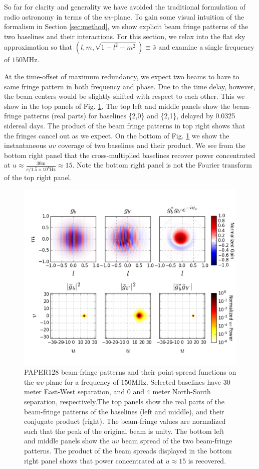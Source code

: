 \documentclass[twocolumn,apj,numberedappendix]{emulateapj}
\renewcommand\[{\begin{equation}}
\renewcommand\]{\end{equation}}
\begin{document}
So far for clarity and generality we have avoided the traditional formulation of radio astronomy in terms of the $uv$-plane. To gain some visual intuition of the formalism in Section \ref{sec:method}, we show explicit beam fringe patterns of the two baselines and their interactions. For this section, we relax into the flat sky approximation so that $(l,m,\sqrt{1-l^2-m^2})\equiv\hat{s}$ and examine a single frequency of $150$MHz. 

At the time-offset of maximum redundancy, we expect two beams to have to same fringe pattern in both frequency and phase. Due to the time delay, however, the beam centers would be slightly shifted with respect to each other. This we show in the top panels of Fig. \ref{fig:beamfringe}. The top left and middle panels show the beam-fringe
patterns (real parts) for baselines \{2,0\} and \{2,1\}, delayed by 0.0325 sidereal days.
The product of the beam fringe patterns in top right shows that the fringes
 cancel out as we expect. On the bottom of Fig. \ref{fig:beamfringe} we show the instantaneous $uv$ coverage of two baselines and their product. We see from the bottom right panel that the cross-multiplied baselines recover  power concentrated at $u\approx\frac{30\text{m}}{c/1.5\times10^8\text{Hz}}\approx15$. Note the bottom right panel is not the Fourier transform of the top right panel. 

\begin{figure}[h!]
\includegraphics[width=\textwidth]{BeamFringe}

\caption{PAPER128 beam-fringe patterns and their point-spread functions on the $uv$-plane for a frequency of $150$MHz. Selected baselines have 30 meter East-West separation, and 0 and 4 meter North-South separation, respectively.The top panels show the real parts of the beam-fringe patterns of the baselines (left and middle), and their conjugate product (right). The beam-fringe values are normalized such that the peak of the original beam is unity. 
The bottom left and middle panels show the $uv$ beam spread of the two beam-fringe patterns. The product of the beam spreads displayed in the bottom right panel shows that power concentrated at $u\approx15$ is recovered. }
\label{fig:beamfringe}
\end{figure}
\end{document}
